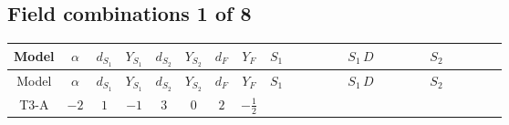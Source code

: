 \documentclass[8pt]{article}
\begin{document}
\begin{landscape}
\subsection*{Field combinations 1 of 8}
\begin{longtable}{@{}cccccccc >{\raggedright\arraybackslash}p{0.21\linewidth} >{\raggedright\arraybackslash}p{0.21\linewidth} >{\raggedright\arraybackslash}p{0.21\linewidth}@{}}
\toprule
Model & $\alpha$ & $d_{S_1}$ & $Y_{S_1}$ & $d_{S_2}$ & $Y_{S_2}$ & $d_F$ & $Y_F$ & $S_1$ & $S_1\,D$ & $S_2$ \\
\midrule
\endfirsthead
\toprule
Model & $\alpha$ & $d_{S_1}$ & $Y_{S_1}$ & $d_{S_2}$ & $Y_{S_2}$ & $d_F$ & $Y_F$ & $S_1$ & $S_1\,D$ & $S_2$ \\
\midrule
\endhead
T3-A & $-2$ & $1$ & $-1$ & $3$ & $0$ & $2$ & $-\frac{1}{2}$ & \scriptsize\adjustbox{max width=\linewidth}{$\begin{gathered} -\frac{2 \hbar  \overline{y_{1,i_1,r_1}} \overline{y_{1,i_2,r_2}} S_1^2 y_{1,i_1,r_2} y_{1,i_2,r_1} \left(S_1{}^{\dagger }\right){}^2}{\epsilon } \\ -C_{S_1^\dagger S_1} S_1 S_1{}^{\dagger } \\ +C_{S_1^\dagger S_1} \hbar  \overline{y_{1,i_1,r_1}} S_1 y_{1,i_1,r_1} S_1{}^{\dagger }\end{gathered}$} & \scriptsize\adjustbox{max width=\linewidth}{$\begin{gathered} +D_{\mu _1}\left(S_1\right){}^{\dagger } D_{\mu _1}\left(S_1\right)\end{gathered}$} & \scriptsize\adjustbox{max width=\linewidth}{$\begin{gathered} +\frac{2 \hbar  \overline{y_{2,i_1,r_1}} \overline{y_{2,i_2,r_2}} S_{2,j_2}^2 y_{2,i_1,r_2} y_{2,i_2,r_1} \left(S_{2,j_1}{}^{\dagger }\right){}^2}{3 \epsilon } \\ -C_{S_2^\dagger S_2} S_{2,j_1} S_{2,j_1}{}^{\dagger } \\ +\frac{C_{S_2^\dagger S_2} \hbar  \overline{y_{2,i_1,r_1}} S_{2,j_1} y_{2,i_1,r_1} S_{2,j_1}{}^{\dagger }}{\sqrt{3}}\end{gathered}$} \\

\end{longtable}
\end{landscape}
\end{document}
